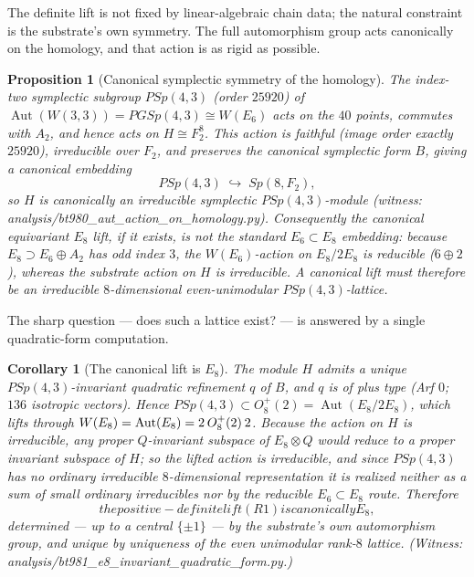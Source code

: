 \documentclass[12pt,a4paper]{article}
\def\mathbb#1{#1}%
\def\mathrm#1{#1}%
\def\texttt#1{#1}%
\def\text#1{#1}%
\def\cdot{ }%
\newtheorem{proposition}[theorem]{Proposition}
\newtheorem{corollary}[theorem]{Corollary}
\theoremstyle{definition}
\begin{document}
The definite lift is not fixed by linear-algebraic chain data; the natural
constraint is the substrate's own symmetry. The full automorphism group acts
canonically on the homology, and that action is as rigid as possible.

\begin{proposition}[Canonical symplectic symmetry of the homology]
\label{prop:canonical-symmetry}
The index-two symplectic subgroup $\mathrm{PSp}(4,3)$ (order $25920$) of
$\operatorname{Aut}(W(3,3))=\mathrm{PGSp}(4,3)\cong W(E_6)$ acts on the
$40$ points, commutes with $A_2$, and hence acts on
$H\cong\mathbb F_2^{8}$. This action is
\emph{faithful} (image order exactly $25920$), \emph{irreducible} over
$\mathbb F_2$, and \emph{preserves the canonical symplectic form} $B$, giving
a canonical embedding
\[
  \mathrm{PSp}(4,3)\;\hookrightarrow\;\mathrm{Sp}(8,\mathbb F_2),
\]
so $H$ is canonically an \emph{irreducible} symplectic $\mathrm{PSp}(4,3)$-module
(witness: \texttt{analysis/bt980\_aut\_action\_on\_homology.py}). Consequently
the canonical equivariant $E_8$ lift, if it exists, is \emph{not} the standard
$E_6\subset E_8$ embedding: because $E_8\supset E_6\oplus A_2$ has odd index
$3$, the $W(E_6)$-action on $E_8/2E_8$ is reducible ($6\oplus2$), whereas the
substrate action on $H$ is irreducible. A canonical lift must therefore be an
irreducible $8$-dimensional even-unimodular $\mathrm{PSp}(4,3)$-lattice.
\end{proposition}

The sharp question --- does such a lattice exist? --- is answered by a single
quadratic-form computation.

\begin{corollary}[The canonical lift is $E_8$]
\label{cor:e8-canonical}
The module $H$ admits a \emph{unique} $\mathrm{PSp}(4,3)$-invariant quadratic
refinement $q$ of $B$, and $q$ is of \emph{plus type} (Arf $0$; $136$ isotropic
vectors). Hence $\mathrm{PSp}(4,3)\subset O_8^{+}(2)=\operatorname{Aut}(E_8/2E_8)$,
which lifts through $W(E_8)=\operatorname{Aut}(E_8)=2\hskip1pt{\cdot}\hskip1pt
O_8^{+}(2)\hskip1pt{\cdot}\hskip1pt2$. Because the action on $H$ is irreducible,
any proper $\mathbb Q$-invariant subspace of $E_8\otimes\mathbb Q$ would reduce
to a proper invariant subspace of $H$; so the lifted action is irreducible, and
since $\mathrm{PSp}(4,3)$ has \emph{no} ordinary irreducible $8$-dimensional
representation it is realized neither as a sum of small ordinary irreducibles
nor by the reducible $E_6\subset E_8$ route. Therefore
\[
  \boxed{\;\text{the positive-definite lift (R1) is canonically } E_8,\;}
\]
determined --- up to a central $\{\pm1\}$ --- by the substrate's own
automorphism group, and unique by uniqueness of the even unimodular rank-$8$
lattice. (Witness: \texttt{analysis/bt981\_e8\_invariant\_quadratic\_form.py}.)
\end{corollary}
\end{document}

